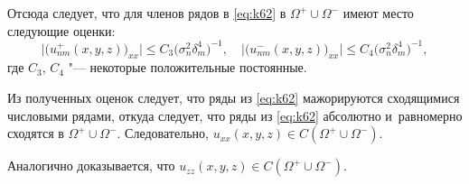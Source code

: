 	Отсюда следует, что для членов рядов в \eqref{eq:k62} в $\Omega^+\cup\Omega^-$  имеют место следующие оценки:
$$
\bigl| \bigl( u^+_{nm}(x,y,z)\bigr)_{xx}\bigr|\le {C_3}\bigl({\sigma_n^2\delta_m^4}\bigr)^{-1},
\quad 
\bigl| \bigl( u^-_{nm}(x,y,z)\bigr)_{xx}\bigr|\le {C_4}\bigl({\sigma_n^2\delta_m^4}\bigr)^{-1},
$$
где $C_3$, $C_4$ "--- некоторые положительные постоянные.

	Из полученных оценок следует, что ряды из \eqref{eq:k62} мажорируются сходящимися числовыми рядами, откуда следует, что ряды из \eqref{eq:k62} абсолютно и~равномерно сходятся в $\Omega^+\cup\Omega^-.$ 
Следовательно, $u_{xx}(x,y,z)\in C(\Omega^+\cup\Omega^-).$

Аналогично доказывается, что $u_{zz}(x,y,z)\in C(\Omega^+\cup\Omega^-).$

